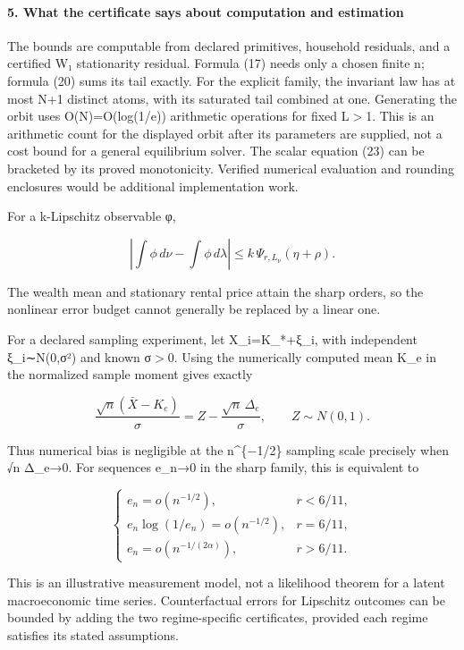 \documentclass{article}
\begin{document}
\paragraph{5. What the certificate says about computation and estimation}

The bounds are computable from declared primitives, household residuals, and a certified W₁ stationarity residual. Formula (17) needs only a chosen finite n; formula (20) sums its tail exactly. For the explicit family, the invariant law has at most N+1 distinct atoms, with its saturated tail combined at one. Generating the orbit uses O(N)=O(log(1/e)) arithmetic operations for fixed L\(\gt\)1. This is an arithmetic count for the displayed orbit after its parameters are supplied, not a cost bound for a general equilibrium solver. The scalar equation (23) can be bracketed by its proved monotonicity. Verified numerical evaluation and rounding enclosures would be additional implementation work.

For a k-Lipschitz observable φ,

\[
\left|\int\phi\,d\nu-\int\phi\,d\lambda\right|
\le k\,\Psi_{r,L_\nu}(\eta+\rho).
\]

The wealth mean and stationary rental price attain the sharp orders, so the nonlinear error budget cannot generally be replaced by a linear one.

For a declared sampling experiment, let X\_i=K\_*+ξ\_i, with independent ξ\_i∼N(0,σ²) and known σ\(\gt\)0. Using the numerically computed mean K\_e in the normalized sample moment gives exactly

\[
\frac{\sqrt n(\bar X-K_e)}{\sigma}
=Z-\frac{\sqrt n\,\Delta_e}{\sigma},
\qquad Z\sim N(0,1).
\]

Thus numerical bias is negligible at the n\^{}\{−1/2\} sampling scale precisely when √n Δ\_e→0. For sequences e\_n→0 in the sharp family, this is equivalent to

\[
\begin{cases}
e_n=o(n^{-1/2}),&r<6/11,\\
e_n\log(1/e_n)=o(n^{-1/2}),&r=6/11,\\
e_n=o(n^{-1/(2\alpha)}),&r>6/11.
\end{cases}
\]

This is an illustrative measurement model, not a likelihood theorem for a latent macroeconomic time series. Counterfactual errors for Lipschitz outcomes can be bounded by adding the two regime-specific certificates, provided each regime satisfies its stated assumptions.
\end{document}

